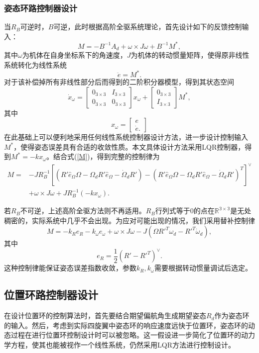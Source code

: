 \subsubsection*{姿态环路控制器设计}
当$R_B$可逆时，$B$可逆，此时根据高阶全驱系统理论\cite{duan1}，首先设计如下的反馈控制输入：\begin{equation}
  M=-B^{-1} A_d+\omega \times J\omega +B^{-1}M^*,
  \label{M}
\end{equation}
其中$\omega$为机体在自身坐标系下的角速度，$J$为机体的转动惯量矩阵，使得原非线性系统转化为线性系统
    $$\ddot e=M^*.$$
对于该补偿掉所有非线性部分后而得到的二阶积分器模型，得到其状态空间
    $$\dot x_\omega=\begin{bmatrix}
        0_{3\times 3} & I_{3\times 3} \\
        0_{3\times 3} & 0_{3\times 3}
    \end{bmatrix} x_\omega+\begin{bmatrix}
        0_{3\times 3} \\ I_{3\times 3}
    \end{bmatrix} M^* ,$$
   其中$$x_\omega=\begin{bmatrix}
        e \\ \dot e.
    \end{bmatrix}$$
在此基础上可以便利地采用任何线性系统控制器设计方法，进一步设计控制输入$M^*$，使得姿态误差具有合适的收敛性质。本文具体设计方法采用LQR控制器，得到$M^*=-kx_\omega$。结合式(\ref{M})，得到完整的控制律为
   $$ \begin{aligned}
        M=&-J R_B^{-1} [(R' \hat e_\Omega \Omega  -\Omega_d R' \hat e_\Omega -\dot \Omega_d R')-(R' \hat e_\Omega \Omega  -\Omega_d R' \hat e_\Omega -\dot \Omega_d R')^T]^\vee \\
         &+\omega \times J\omega + J R_B^{-1}(-kx_\omega).
    \end{aligned}$$

    若$R_B$不可逆，上述高阶全驱方法则不再适用。$R_B$行列式等于$0$的点在$\mathbb{R^{3 \times 3}}$是无处稠密的，实际系统中几乎不会出现。为应对可能出现的情况，我们采用替补控制律\cite{Lee2010}
    $$M=-k_R e_R-k_\omega e_\omega+\omega \times J \omega -J(\Omega R'^T \omega_d-R'^T \dot \omega_d), $$
    其中
    $$ e_R=\frac{1}{2} (R'-R'^T)^\vee.$$
    这种控制律能保证姿态误差指数收敛，参数$k_R,k_\omega$需要根据转动惯量调试后选定。
    \subsection*{位置环路控制器设计}
    在设计位置环的控制算法时，首先要结合期望偏航角生成期望姿态$R_d$作为姿态环的输入。然后，考虑到实际四旋翼中姿态环的响应速度远快于位置环，姿态环的动态过程在进行位置环控制设计时可以被忽略。这一假设进一步简化了位置环的动力学方程，使其也能被视作一个线性系统，仍然采用LQR方法进行控制设计。

